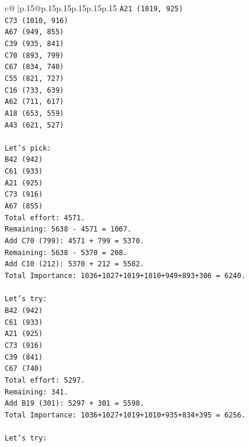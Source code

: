 \documentclass{article}
\begin{document}
{\begin{supertabular}{c@{$\;$}|p{.15\linewidth}@{}p{.15\linewidth}p{.15\linewidth}p{.15\linewidth}p{.15\linewidth}p{.15\linewidth}}
{{{\texttt{A21 (1019, 925)} \\
\texttt{C73 (1010, 916)} \\
\texttt{A67 (949, 855)} \\
\texttt{C39 (935, 841)} \\
\texttt{C70 (893, 799)} \\
\texttt{C67 (834, 740)} \\
\texttt{C55 (821, 727)} \\
\texttt{C16 (733, 639)} \\
\texttt{A62 (711, 617)} \\
\texttt{A18 (653, 559)} \\
\texttt{A43 (621, 527)} \\
\\ 
\texttt{Let's pick:} \\
\texttt{B42 (942)} \\
\texttt{C61 (933)} \\
\texttt{A21 (925)} \\
\texttt{C73 (916)} \\
\texttt{A67 (855)} \\
\texttt{Total effort: 4571.} \\
\texttt{Remaining: 5638 {-} 4571 = 1067.} \\
\texttt{Add C70 (799): 4571 + 799 = 5370.} \\
\texttt{Remaining: 5638 {-} 5370 = 268.} \\
\texttt{Add C10 (212): 5370 + 212 = 5582.} \\
\texttt{Total Importance: 1036+1027+1019+1010+949+893+306 = 6240.} \\
\\ 
\texttt{Let's try:} \\
\texttt{B42 (942)} \\
\texttt{C61 (933)} \\
\texttt{A21 (925)} \\
\texttt{C73 (916)} \\
\texttt{C39 (841)} \\
\texttt{C67 (740)} \\
\texttt{Total effort: 5297.} \\
\texttt{Remaining: 341.} \\
\texttt{Add B19 (301): 5297 + 301 = 5598.} \\
\texttt{Total Importance: 1036+1027+1019+1010+935+834+395 = 6256.} \\
\\ 
\texttt{Let's try:} \\
}}}
\end{supertabular}}
\end{document}
